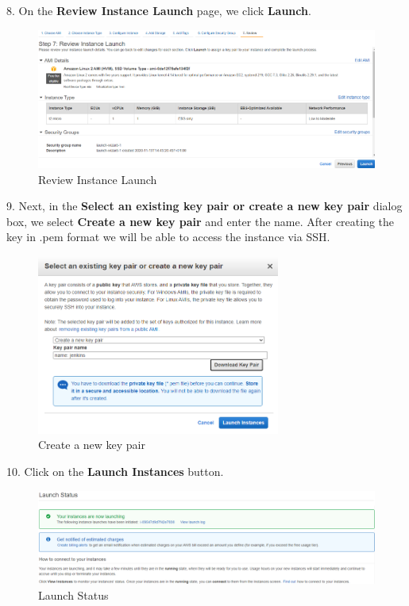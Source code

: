 \documentclass[12pt,a4paper,twoside]{article}
\begin{document}
8. On the \textbf{Review Instance Launch} page, we click \textbf{Launch}.


\begin{figure}[H]
    \centering
        \includegraphics[width=15cm]{images-aws/9-review-instance-launch.png}
        \caption{Review Instance Launch}
\end{figure}


9. Next, in the \textbf{Select an existing key pair or create a new key pair} dialog box, we select \textbf{Create a new key pair} and enter the name. After creating the key in .pem format we will be able to access the instance via SSH.


\begin{figure}[H]
    \centering
        \includegraphics[width=8cm]{images-aws/10-key-pair.png}
        \caption{Create a new key pair}
\end{figure}


10. Click on the \textbf{Launch Instances} button.


\begin{figure}[H]
    \centering
        \includegraphics[width=15cm]{images-aws/11-launch-status.png}
        \caption{Launch Status}
\end{figure}
\end{document}
